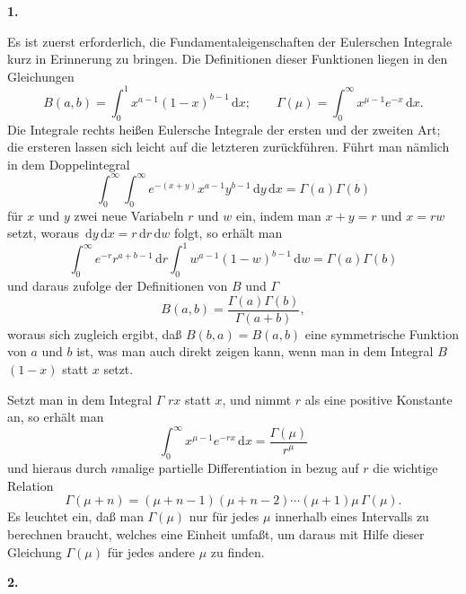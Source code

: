 \documentclass[11pt]{article}
\newcommand{\dd}{\,\mathrm d}
\newcommand{\art}[1]{\bigskip\begin{center}\large\bfseries #1.\end{center}\nopagebreak}
\begin{document}
\art{1}

Es ist zuerst erforderlich, die Fundamentaleigenschaften der Eulerschen Integrale kurz in Erinnerung zu bringen. Die Definitionen dieser Funktionen liegen in den Gleichungen
\begin{equation}
B(a,b)=\int_0^1 x^{a-1}(1-x)^{b-1}\dd x; \qquad
\Gamma(\mu)=\int_0^\infty x^{\mu-1}e^{-x}\dd x .
\tag{1}
\end{equation}
Die Integrale rechts heißen Eulersche Integrale der ersten und der zweiten Art; die ersteren lassen sich leicht auf die letzteren zurückführen. Führt man nämlich in dem Doppelintegral
\[
\int_0^\infty\!\int_0^\infty e^{-(x+y)}x^{a-1}y^{b-1}\dd y\dd x=\Gamma(a)\Gamma(b)
\]
für $x$ und $y$ zwei neue Variabeln $r$ und $w$ ein, indem man $x+y=r$ und $x=rw$ setzt, woraus $\dd y\dd x=r\dd r\dd w$ folgt, so erhält man
\[
\int_0^\infty e^{-r}r^{a+b-1}\dd r\int_0^1 w^{a-1}(1-w)^{b-1}\dd w=\Gamma(a)\Gamma(b)
\]
und daraus zufolge der Definitionen von $B$ und $\Gamma$
\begin{equation}
B(a,b)=\frac{\Gamma(a)\Gamma(b)}{\Gamma(a+b)},
\tag{2}
\end{equation}
woraus sich zugleich ergibt, daß $B(b,a)=B(a,b)$ eine symmetrische Funktion von $a$ und $b$ ist, was man auch direkt zeigen kann, wenn man in dem Integral $B$ $(1-x)$ statt $x$ setzt.

Setzt man in dem Integral $\Gamma$ $rx$ statt $x$, und nimmt $r$ als eine positive Konstante an, so erhält man
\begin{equation}
\int_0^\infty x^{\mu-1}e^{-rx}\dd x=\frac{\Gamma(\mu)}{r^\mu}
\tag{3}
\end{equation}
und hieraus durch $n$malige partielle Differentiation in bezug auf $r$ die wichtige Relation
\begin{equation}
\Gamma(\mu+n)=(\mu+n-1)(\mu+n-2)\cdots(\mu+1)\mu\,\Gamma(\mu).
\tag{4}
\end{equation}
Es leuchtet ein, daß man $\Gamma(\mu)$ nur für jedes $\mu$ innerhalb eines Intervalls zu berechnen braucht, welches eine Einheit umfaßt, um daraus mit Hilfe dieser Gleichung $\Gamma(\mu)$ für jedes andere $\mu$ zu finden.

\art{2}
\end{document}
